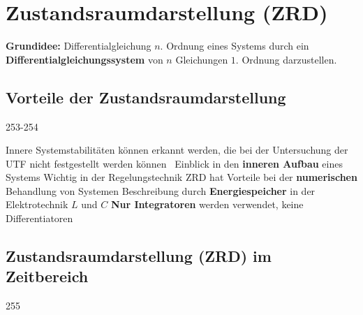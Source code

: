 \section{Zustandsraumdarstellung (ZRD)}

\textbf{Grundidee:} Differentialgleichung $n.$ Ordnung eines Systems durch ein \textbf{Differentialgleichungssystem} 
von $n$ Gleichungen $1.$ Ordnung darzustellen.


\subsection{Vorteile der Zustandsraumdarstellung}{253-254}

\begin{outline}
    \1 Innere Systemstabilitäten können erkannt werden, die bei der Untersuchung der UTF 
        nicht festgestellt werden können \textrightarrow\ Einblick in den \textbf{inneren Aufbau} eines Systems
    \1 Wichtig in der Regelungstechnik
    \1ZRD hat Vorteile bei der \textbf{numerischen} Behandlung von Systemen
    \1 Beschreibung durch \textbf{Energiespeicher}
        \2 in der Elektrotechnik $L$ und $C$
    \1 \textbf{Nur Integratoren} werden verwendet, keine Differentiatoren
\end{outline}


\subsection{Zustandsraumdarstellung (ZRD) im Zeitbereich}{255}
\label{ZRD Zeitbereich}

